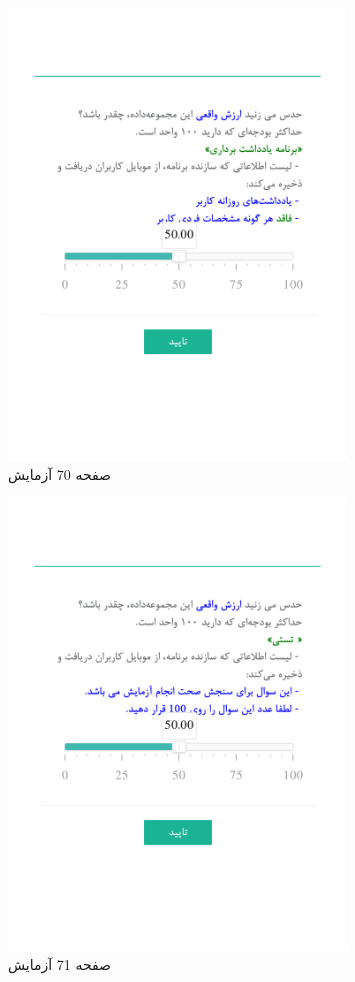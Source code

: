 \begin{figure}[htpb]
    \centering
    \includegraphics[width=0.8\textwidth]{./img/Task70.png}
    \caption{ صفحه 70 آزمایش }
    \label{fig:Task70}
\end{figure}


\begin{figure}[htpb]
    \centering
    \includegraphics[width=0.8\textwidth]{./img/Task71.png}
    \caption{ صفحه 71 آزمایش }
    \label{fig:Task71}
\end{figure}


